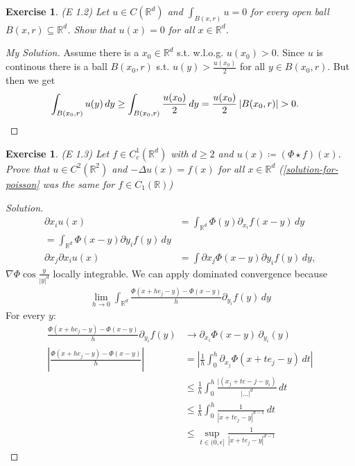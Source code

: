 \documentclass{report}
\theoremstyle{tommy}
\newtheorem{ex}[defn]{Exercise}
\begin{document}
\begin{ex} (E 1.2)
  Let \(u \in C(\mathbb{R}^d)\) and \(\int_{B(x, r)} u = 0\) for every open ball \(B(x, r) \subseteq \mathbb{R}^d\). Show that \(u(x) = 0\) for all \(x \in \mathbb{R}^d\).
\end{ex}

\begin{proof}[My Solution]
  Assume there is a \(x_0 \in \mathbb{R}^d\) s.t. w.l.o.g. \(u(x_0) > 0\). Since \(u\) is continous there is a ball \(B(x_0, r)\) s.t. \(u(y) > \frac{u(x_0)}{2}\) for all \(y \in B(x_0, r)\). But then we get
  \begin{align*}
    \int_{B(x_0, r)} u(y) \, dy
    &\ge \int_{B(x_0, r)} \frac{u(x_0)}{2} \, dy
    = \frac{u(x_0)}{2} \, |B(x_0, r)| > 0. \qedhere
  \end{align*}
\end{proof}

\begin{ex} (E 1.3)
  Let \(f \in C_c^1(\mathbb{R}^d)\) with \(d \ge 2\) and \(u(x) \coloneqq (\Phi \star f)(x)\). Prove that \(u \in C^2(\mathbb{R}^2)\) and \(- \Delta u(x) = f(x)\) for all \(x \in \mathbb{R}^d\) (\ref{solution-for-poisson} was the same for \(f \in C_1(\mathbb{R})\))
\end{ex}

\begin{proof} [Solution]
  \begin{align*}
    \partial x_i u(x) 
    &= \int_{\mathbb{R}^d} \Phi(y) \partial_{x_i} f(x-y) \, dy \\
    = \int_{\mathbb{R}^d} \Phi(x-y) \partial y_i f(y) \, dy \\
    \partial x_j \partial x_i u(x) &= \int \partial x_j \Phi(x-y) \partial y_i f(y) \, dy,
  \end{align*}
  \(\nabla \Phi  \cos \frac{y}{|y|^d}\) locally integrable. We can apply dominated convergence because
  \begin{align*}
    \lim_{h \to 0} \int_{\mathbb{R}^d} \frac{\Phi(x + h e_j - y) - \Phi(x-y)}{h} \partial_{y_i} f(y) \, dy
  \end{align*}
  For every \(y\):
  \begin{align*}
    \frac{\Phi(x + h e_j - y) - \Phi(x-y)}{h} \partial_{y_i} f(y) &\to \partial_{x_i} \Phi(x-y) \, \partial_{y_i}(y) \\
    \left| \frac{\Phi(x + h e_j -y) - \Phi(x-y)}{h} \right| 
    &= \left|\frac{1}{h} \int_0^h \partial_{x_j} \Phi(x + te_j-y) \, dt \right|  \\
    &\le \frac{1}{h} \int_0^h \frac{|(x_j + te-j - y_i)}{| \dots |^d} \, dt \\
    &\le \frac{1}{h} \int_0^h \frac{1}{|x + te_j - y|^{d-1}} \, dt \\ 
    &\le \sup_{t \in (0, \epsilon]} \frac{1}{|x + te_j - y|^{d-1}}
  \end{align*}
\end{proof}
\end{document}
